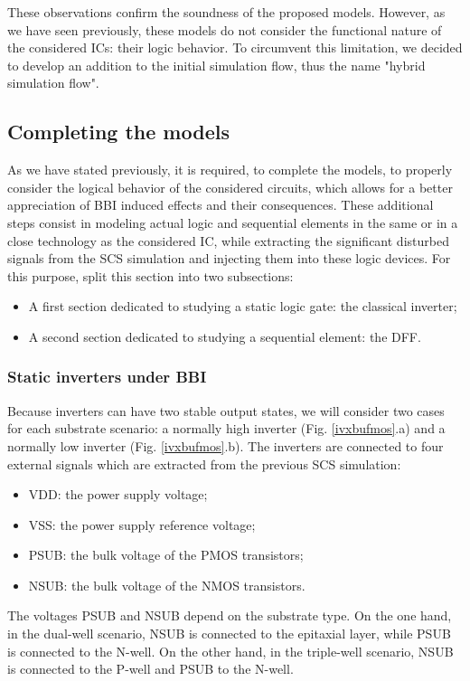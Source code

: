 	These observations confirm the soundness of the proposed models.
	However, as we have seen previously, these models do not consider the functional nature of the considered ICs: their logic behavior.
	To circumvent this limitation, we decided to develop an addition to the initial simulation flow, thus the name "hybrid simulation flow".

\subsection{Completing the models}
	As we have stated previously, it is required, to complete the models, to properly consider the logical behavior of the considered circuits, which allows for a better appreciation of BBI induced effects and their consequences.
	These additional steps consist in modeling actual logic and sequential elements in the same or in a close technology as the considered IC, while extracting the significant disturbed signals from the SCS simulation and injecting them into these logic devices.
	For this purpose, split this section into two subsections:
	\begin{itemize}
		\item A first section dedicated to studying a static logic gate: the classical inverter;
		\item A second section dedicated to studying a sequential element: the DFF.
	\end{itemize}

	\subsubsection{Static inverters under BBI}
		
		Because inverters can have two stable output states, we will consider two cases for each substrate scenario: a normally high inverter (Fig. \ref{ivxbufmos}.a) and a normally low inverter (Fig. \ref{ivxbufmos}.b).
		The inverters are connected to four external signals which are extracted from the previous SCS simulation:
		\begin{itemize}
				\item VDD: the power supply voltage;
				\item VSS: the power supply reference voltage;
				\item PSUB: the bulk voltage of the PMOS transistors;
				\item NSUB: the bulk voltage of the NMOS transistors.
			\end{itemize}
		The voltages PSUB and NSUB depend on the substrate type.
		On the one hand, in the dual-well scenario, NSUB is connected to the epitaxial layer, while PSUB is connected to the N-well.
		On the other hand, in the triple-well scenario, NSUB is connected to the P-well and PSUB to the N-well.


